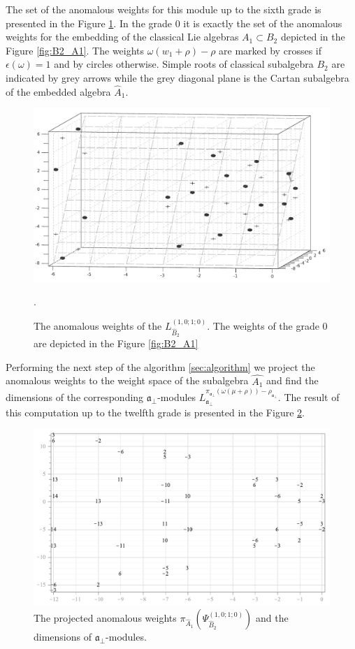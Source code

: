 \documentclass[a4paper,12pt]{article}
\theoremstyle{definition} \newtheorem{Def}{Definition}
\begin{document}
The set of the anomalous weights for this module up to the sixth grade is presented in the Figure \ref{fig:affine_B2_anom_point}. In the grade 0 it is exactly the set of the anomalous weights for the embedding of the classical Lie algebras $A_1\subset B_2$ depicted in the  Figure \ref{fig:B2_A1}. The weights $\omega (w_1+\rho)-\rho$ are marked by crosses if $\epsilon(\omega)=1$ and by circles otherwise. Simple roots of classical subalgebra $B_2$ are indicated by grey arrows while the grey diagonal plane is the Cartan subalgebra of the embedded algebra $\hat{A}_1$.

\begin{figure}[h!tb]
  \includegraphics[width=140mm]{AffineB2_A1_Anom.pdf}
  \caption{The anomalous weights of the $L^{(1,0;1;0)}_{\hat B_2 }$. The weights of the grade 0 are depicted in the Figure \ref{fig:B2_A1}}.
  \label{fig:affine_B2_anom_point}
\end{figure}

Performing the next step of the algorithm \ref{sec:algorithm} we project the anomalous weights to the weight space of the subalgebra $\hat{A_1}$ and find the dimensions of the corresponding $\mathfrak{a}_{\bot}$-modules $L^{\pi_{\mathfrak{a}_{\bot}}(\omega(\mu+\rho))-\rho_{\mathfrak{a}_{\bot}}}_{\mathfrak{a}_{\bot}}$.
The result of this computation up to the twelfth grade is presented in the Figure
\ref{fig:AffineB2_A1_anom_proj}.
\begin{figure}[p]
  \centering
  \includegraphics[width=120mm]{AffineB2_A1_proj_anom.pdf}
  \caption{The projected anomalous weights $\pi_{\hat A_1}\left(\Psi^{(1,0;1;0)}_{\hat B_2}\right)$ and the dimensions of $\mathfrak{a}_{\bot}$-modules.}
  \label{fig:AffineB2_A1_anom_proj}
\end{figure}
\end{document}
